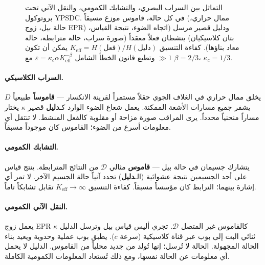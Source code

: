 \documentclass[12pt,a4paper]{article}
\theoremstyle{remark}
\begin{document}
\begin{otherlanguage}{english}
\begin{figure}[htbp]
{%
			}
			\caption{التماثل بين السراب البصري، والتشابك الكمومي، والنقل الآني تحت بروتوكول YPSDC. في كل حالة، قاموس موزع مسبقاً (ممال حراري، حالة بيل، زوج EPR) ودليل قصير مرسل (اتجاه الضوء، نتيجة القياس، بتان كلاسيكيان) ينشطان فعلاً معقداً (صورة سراب، حالة مترابطة، حالة معاد بناؤها). كفاءة التنسيق \(K_{\mathrm{eff}} = H(\text{فعل})/H(\text{دليل})\) يمكن أن تكون \(\gg 1\) وتطيع قانون الخطأ الشامل \(\varepsilon = \kappa_c \alpha K_{\mathrm{eff}}^{-\beta}\) مع \(\beta=2/3\)، \(\kappa_c=1/3\).}
			\label{fig:mirage-ypsdc}
		\end{figure}
	\end{otherlanguage}
	
	\paragraph{السراب الكلاسيكي.}
	يخلق ممال حراري في الغلاف الجوي حقلاً مستمراً لقرينة الانكسار — \textbf{قاموساً} طبيعياً \(D\) يشفر جميع مسارات الأشعة الممكنة. يعمل شعاع الضوء الوارد كـ\textbf{دليل} قصير \(\kappa\) يختار مساراً منحنياً محدداً. يرى المراقب صورة مزاحة أو مقلوبة كالفعل المنشط. لا تنتقل أي معلومات أسرع من الضوء؛ القاموس كان موجوداً مسبقاً.
	
	\paragraph{التشابك الكمومي.}
	يتشارك جسيمان في حالة بيل — \textbf{قاموس} مثالي \(\mathcal{D}\) من النتائج المترابطة. ينتج قياس على أحد الجسيمين نتيجة عشوائية (الـ\textbf{دليل}) تحدد آنياً حالة الجسيم الآخر. لا تمر أي إشارة بينهما؛ الترابط كان مؤسساً مسبقاً. كفاءة التنسيق \(K_{\mathrm{eff}} \to \infty\) تقابل تشابكاً تاماً.
	
	\paragraph{النقل الآني الكمومي.}
	يعمل زوج EPR كالقاموس غير المتصل \(\mathcal{D}\). تجري أليس قياس بيل وترسل الدليل \(\kappa\) ثنائي البت إلى بوب عبر قناة كلاسيكية (سرعة \(c\)). يطبق بوب عملية وحدوية ويعيد بناء الحالة المجهولة. الحالة لا تُرسل؛ إنها تُولد من جديد محلياً من القاموس. الدليل لا يحمل أي معلومات عن الحالة نفسها، ومع ذلك تُستعاد المعلومات الكمومية الكاملة.
	
\end{document}
